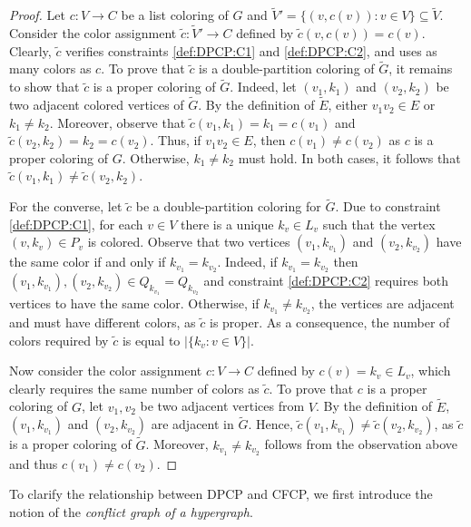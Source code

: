 \documentclass[preprint, 11pt, authoryear]{elsarticle}
\begin{document}
\begin{proof} 
    Let $c: V \longrightarrow C$ be a list coloring of $G$ and  $\tilde V' = \{(v,c(v)) : v \in V\} \subseteq \tilde{V}$. 
    Consider the color assignment $\tilde c: \tilde V' \to C$ defined by $\tilde c(v,c(v)) = c(v)$.
    Clearly, $\tilde c$ verifies constraints \ref{def:DPCP:C1} and \ref{def:DPCP:C2}, and uses as many colors as $c$.
    To prove that $\tilde c$ is a double-partition coloring of $\tilde G$, it remains to show that $\tilde c$ is a 
    proper coloring of $\tilde G$. Indeed, let $(v_1,k_1)$ and $(v_2,k_2)$ be two adjacent colored vertices of $\tilde G$. By the definition of $\tilde E$, either $v_1v_2 \in E$ or $k_1 \neq k_2$. Moreover, observe that $\tilde c(v_1,k_1) = k_1 = c(v_1)$ and $\tilde c(v_2,k_2) = k_2 = c(v_2)$. Thus, if $v_1v_2 \in E$, then $c(v_1) \neq c(v_2)$ as $c$ is a proper coloring of $G$. Otherwise, $k_1 \neq k_2$ must hold.
    In both cases, it follows that $\tilde c (v_1,k_1) \neq \tilde c(v_2,k_2)$.

    For the converse, let $\tilde c$ be a double-partition coloring for $\tilde G$.
    Due to constraint \ref{def:DPCP:C1}, for each $v\in V$ there is a unique $k_v \in L_v$ such that the vertex $(v, k_v) \in P_v$ is colored. 
    Observe that two vertices $(v_1, k_{v_1})$ and $(v_2, k_{v_2})$ have the same color if and only if $k_{v_1} = k_{v_2}$. Indeed, if $k_{v_1} = k_{v_2}$ then $(v_1, k_{v_1}), (v_2, k_{v_2}) \in Q_{k_{v_1}} = Q_{k_{v_2}}$ and constraint \ref{def:DPCP:C2} requires both vertices to have the same color. Otherwise, if $k_{v_1} \neq k_{v_2}$, the vertices are adjacent and must have different colors, as $\tilde c$ is proper. As a consequence, the number of colors required by $\tilde c$ is equal to $|\{k_v : v \in V\}|$.
    
    Now consider the color assignment $ c: V \longrightarrow C$ defined by $c(v)=k_v \in L_v$, which clearly requires the same number of colors as $\tilde c$.
    To prove that $c$ is a proper coloring of $G$, let $v_1,v_2$ be two adjacent vertices from $V$. 
    By the definition of $\tilde E$, $(v_1,k_{v_1})$ and $(v_2,k_{v_2})$ are adjacent in $\tilde G$. 
    Hence, $\tilde c(v_1,k_{v_1})\neq \tilde c(v_2,k_{v_2})$, as $\tilde c$ is a proper coloring of $\tilde G$. 
    Moreover, $k_{v_1} \neq k_{v_2}$ follows from the observation above and thus $c(v_1) \neq c(v_2)$.
\end{proof}

To clarify the relationship between DPCP and CFCP, we first introduce the notion of the \emph{conflict graph of a hypergraph}.
\end{document}
